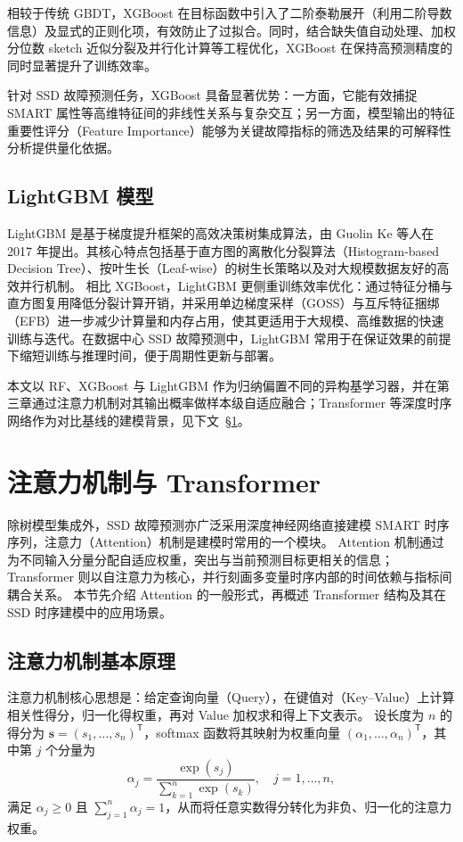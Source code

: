 相较于传统 GBDT，XGBoost 在目标函数中引入了二阶泰勒展开（利用二阶导数信息）及显式的正则化项，有效防止了过拟合。同时，结合缺失值自动处理、加权分位数 sketch 近似分裂及并行化计算等工程优化，XGBoost 在保持高预测精度的同时显著提升了训练效率。

针对 SSD 故障预测任务，XGBoost 具备显著优势：一方面，它能有效捕捉 SMART 属性等高维特征间的非线性关系与复杂交互；另一方面，模型输出的特征重要性评分（Feature Importance）能够为关键故障指标的筛选及结果的可解释性分析提供量化依据。

\subsection{LightGBM 模型}
LightGBM 是基于梯度提升框架的高效决策树集成算法，由 Guolin Ke 等人在 2017 年提出\cite{ke2017lightgbm}。其核心特点包括基于直方图的离散化分裂算法（Histogram-based Decision Tree）、按叶生长（Leaf-wise）的树生长策略以及对大规模数据友好的高效并行机制。
相比 XGBoost，LightGBM 更侧重训练效率优化：通过特征分桶与直方图复用降低分裂计算开销，并采用单边梯度采样（GOSS）与互斥特征捆绑（EFB）进一步减少计算量和内存占用，使其更适用于大规模、高维数据的快速训练与迭代。在数据中心 SSD 故障预测中，LightGBM 常用于在保证效果的前提下缩短训练与推理时间，便于周期性更新与部署。

本文以 RF、XGBoost 与 LightGBM 作为归纳偏置不同的异构基学习器，并在第三章通过注意力机制对其输出概率做样本级自适应融合；Transformer 等深度时序网络作为对比基线的建模背景，见下文~\S\ref{sec:chap2-attn-transformer}。

\section{注意力机制与 Transformer}
\label{sec:chap2-attn-transformer}

除树模型集成外，SSD 故障预测亦广泛采用深度神经网络直接建模 SMART 时序序列，注意力（Attention）机制是建模时常用的一个模块。
Attention 机制通过为不同输入分量分配自适应权重，突出与当前预测目标更相关的信息；Transformer 则以自注意力为核心，并行刻画多变量时序内部的时间依赖与指标间耦合关系\cite{vaswani2017attention,lu2020making,koh2024temporal, zhang2024msfrd}。
本节先介绍 Attention 的一般形式，再概述 Transformer 结构及其在 SSD 时序建模中的应用场景。

\subsection{注意力机制基本原理}

注意力机制核心思想是：给定查询向量（Query），在键值对（Key--Value）上计算相关性得分，归一化得权重，再对 Value 加权求和得上下文表示。
设长度为 $n$ 的得分为 $\mathbf{s}=(s_1,\ldots,s_n)^{\mathsf{T}}$，softmax 函数将其映射为权重向量 $(\alpha_1,\ldots,\alpha_n)^{\mathsf{T}}$，其中第 $j$ 个分量为
\begin{equation}
\label{equ:softmax}
\alpha_j=\frac{\exp(s_j)}{\sum_{k=1}^{n}\exp(s_k)},\quad j=1,\ldots,n,
\end{equation}
满足 $\alpha_j\ge 0$ 且 $\sum_{j=1}^{n}\alpha_j=1$，从而将任意实数得分转化为非负、归一化的注意力权重。

